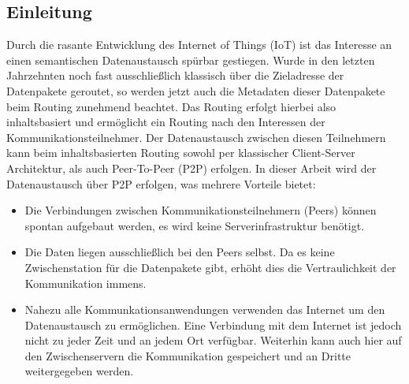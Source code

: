 


\subsection{Einleitung}
Durch die rasante Entwicklung des Internet of Things (IoT) ist das Interesse an einen semantischen Datenaustausch spürbar gestiegen. Wurde in den letzten Jahrzehnten noch fast ausschließlich klassisch über die Zieladresse der Datenpakete geroutet, so werden jetzt auch die Metadaten dieser Datenpakete beim Routing zunehmend beachtet. Das Routing erfolgt hierbei also inhaltsbasiert und ermöglicht ein Routing nach den Interessen der Kommunikationsteilnehmer. Der Datenaustausch zwischen diesen Teilnehmern kann beim inhaltsbasierten Routing sowohl per klassischer Client-Server Architektur, als auch Peer-To-Peer (P2P) erfolgen. In dieser Arbeit wird der Datenaustausch über P2P erfolgen, was mehrere Vorteile bietet:
\begin{itemize}
\item Die Verbindungen zwischen Kommunikationsteilnehmern (Peers) können spontan aufgebaut werden, es wird keine Serverinfrastruktur benötigt.
\item Die Daten liegen ausschließlich bei den Peers selbst. Da es keine Zwischenstation für die Datenpakete gibt, erhöht dies die Vertraulichkeit der Kommunikation immens. 
\item Nahezu alle Kommunkationsanwendungen verwenden das Internet um den Datenaustausch zu ermöglichen. Eine Verbindung mit dem Internet ist jedoch nicht zu jeder Zeit und an jedem Ort verfügbar. Weiterhin kann auch hier auf den Zwischenservern die Kommunikation gespeichert und an Dritte weitergegeben werden.
\end{itemize}  
\newpage


